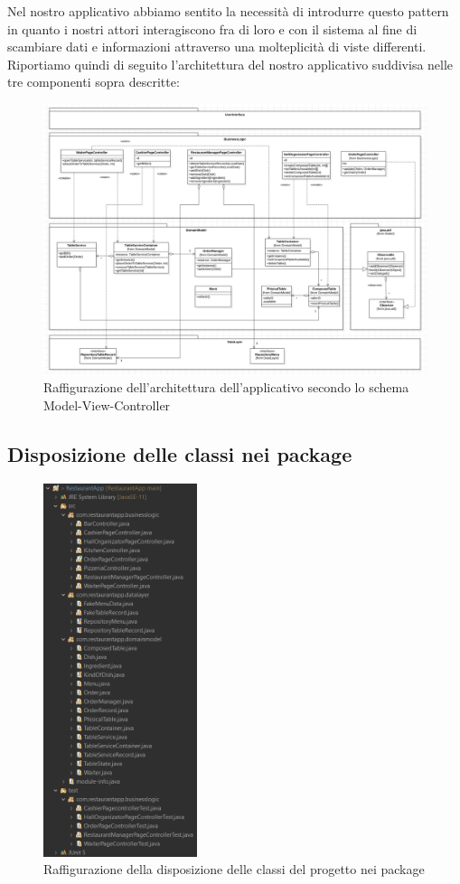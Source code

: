 \documentclass{article}
\begin{document}
\newpage

\noindent Nel nostro applicativo abbiamo sentito la necessit\`a di introdurre questo pattern in quanto i nostri attori interagiscono fra di loro e con il sistema al fine di scambiare dati e informazioni attraverso una molteplicit\`a di viste differenti. \\
Riportiamo quindi di seguito l'architettura del nostro applicativo suddivisa nelle tre componenti sopra descritte:

\begin{figure}[!h]
\centering
\includegraphics[width= 14cm]{"Immagini/Architecture.PNG"}
\caption{Raffigurazione dell'architettura dell'applicativo secondo lo schema Model-View-Controller}
\end{figure}

\newpage

\subsection{Disposizione delle classi nei package} 

\begin{figure}[!h]
\centering
\includegraphics[width= 4.5cm]{"Immagini/Package.PNG"}
\caption{Raffigurazione della disposizione delle classi del progetto nei package}
\end{figure}
\end{document}
